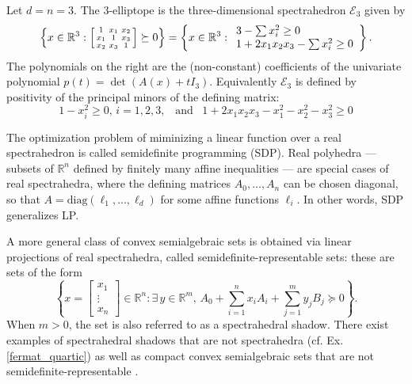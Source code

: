 \documentclass{elsarticle}
\theoremstyle{plain}
\theoremstyle{definition}
\newcommand{\R}{\mathbb{R}} %
\def\diag{\mathrm{diag}}
\begin{document}
\begin{example}\label{ell3}
  Let $d=n=3$. The $3$-elliptope is the three-di\-men\-sio\-nal spectrahedron
  $\mathcal{E}_3$ given by
  $$
  \left\{
  x
  \in \R^3 :
  \left[
  \begin{smallmatrix}
    1 & x_1 & x_2 \\
    x_1 & 1 & x_3 \\
    x_2 & x_3 & 1
  \end{smallmatrix}
  \right]
  \succeq 0
  \right\}
  =
  \left\{
  x
  \in \R^3 :
  \begin{array}{l}
    {\footnotesize 3-\sum x_i^2 \geq 0} \\
    {\footnotesize 1+2x_1x_2x_3-\sum x_i^2 \geq 0}
  \end{array}
  \right\}.
  $$
  The polynomials on the right are the (non-constant) coefficients of the
  univariate polynomial $p(t) = \det(A(x)+t I_3)$. Equivalently $\mathcal{E}_3$
  is defined by positivity of the principal minors of the defining matrix:
  $$
  1-x_i^2 \geq 0, \, i=1,2,3, \,\,\, \text{ and } \,\,\,
  1+2x_1x_2x_3-x_1^2-x_2^2-x_3^2 \geq 0
  $$
\end{example}

The optimization problem of miminizing a linear function over a real spectrahedron
is called {semidefinite programming} (SDP).
{Real polyhedra} --- subsets of $\R^n$ defined by finitely many affine inequalities --- are special cases of real
spectrahedra, where the defining matrices $A_0, \ldots, A_n$ can be chosen diagonal, so that
$A = \diag(\ell_1,\ldots, \ell_d)$ for some affine functions $\ell_i$. In other words, SDP generalizes LP.

A more general class of convex semialgebraic sets is obtained via linear projections of real spectrahedra,
called semidefinite-re\-pre\-sen\-ta\-ble sets: these are sets of the form
$$
\left\{x = \left[\begin{smallmatrix} x_1 \\ \vdots \\ x_n \end{smallmatrix}\right] \in \R^n : \exists\,y\in\R^m, \, A_0 + \sum_{i=1}^n x_i A_i + \sum_{j=1}^m y_j B_j \succeq 0\right\}.
$$
When $m>0$, the set is also referred to as a spectrahedral shadow. There exist examples of
spectrahedral shadows that are not spectrahedra (cf. Ex. \ref{fermat_quartic}) as well as compact
convex semialgebraic sets that are not semidefinite-representable \cite{scheiderer_spectrahedral_2017}.
\end{document}
